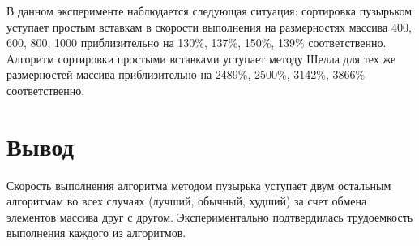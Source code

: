 В данном эксперименте наблюдается следующая ситуация: сортировка пузырьком уступает простым вставкам в скорости выполнения на размерностях массива 400, 600, 800, 1000 приблизительно на 130\%, 137\%, 150\%, 139\% соответственно. Алгоритм сортировки простыми вставками уступает методу Шелла для тех же размерностей массива приблизительно на 2489\%, 2500\%, 3142\%, 3866\% соответственно. 

\section{Вывод}
Скорость выполнения алгоритма методом пузырька уступает двум остальным алгоритмам во всех случаях (лучший, обычный, худший) за счет обмена элементов массива друг с другом. Экспериментально подтвердилась трудоемкость выполнения каждого из алгоритмов. 